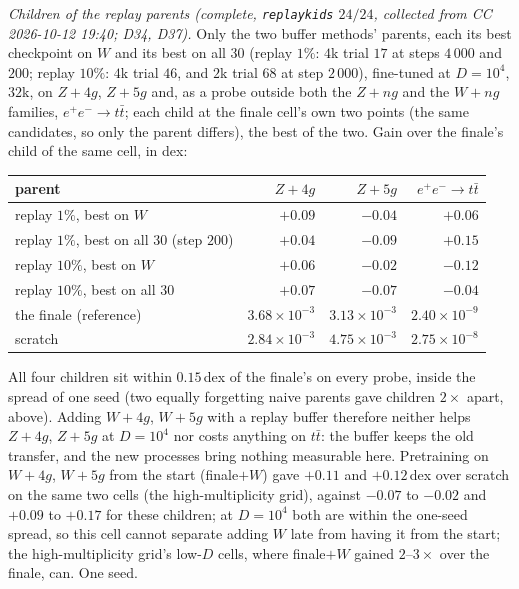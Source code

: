 \documentclass[11pt]{article}
\newcommand{\code}[1]{\texttt{#1}}
\begin{document}
\emph{Children of the replay parents (complete, \code{replaykids} $24/24$, collected from CC 2026-10-12 19:40; D34, D37).}
Only the two buffer methods' parents, each its best checkpoint on $W$ and its best on all $30$ (replay $1\%$: $4$k trial
$17$ at steps $4\,000$ and $200$; replay $10\%$: $4$k trial $46$, and $2$k trial $68$ at step $2\,000$), fine-tuned at
$D=10^4$, $32$k, on $Z+4g$, $Z+5g$ and, as a probe outside both the $Z+ng$ and the $W+ng$ families, $e^+e^-\to t\bar t$;
each child at the finale cell's own two points (the same candidates, so only the parent differs), the best of the two.
Gain over the finale's child of the same cell, in dex:
\begin{center}\small
\begin{tabular}{lrrr}
parent & $Z+4g$ & $Z+5g$ & $e^+e^-\to t\bar t$ \\ \hline
replay $1\%$, best on $W$ & $+0.09$ & $-0.04$ & $+0.06$ \\
replay $1\%$, best on all $30$ (step $200$) & $+0.04$ & $-0.09$ & $+0.15$ \\
replay $10\%$, best on $W$ & $+0.06$ & $-0.02$ & $-0.12$ \\
replay $10\%$, best on all $30$ & $+0.07$ & $-0.07$ & $-0.04$ \\ \hline
the finale (reference) & $3.68\times10^{-3}$ & $3.13\times10^{-3}$ & $2.40\times10^{-9}$ \\
scratch & $2.84\times10^{-3}$ & $4.75\times10^{-3}$ & $2.75\times10^{-8}$ \\
\end{tabular}
\end{center}
All four children sit within $0.15$\,dex of the finale's on every probe, inside the spread of one seed (two equally
forgetting naive parents gave children $2\times$ apart, above). Adding $W+4g$, $W+5g$ with a replay buffer therefore
neither helps $Z+4g$, $Z+5g$ at $D=10^4$ nor costs anything on $t\bar t$: the buffer keeps the old transfer, and the new
processes bring nothing measurable here. Pretraining on $W+4g$, $W+5g$ from the start (finale$+W$) gave $+0.11$ and
$+0.12$\,dex over scratch on the same two cells (the high-multiplicity grid), against $-0.07$ to $-0.02$ and $+0.09$ to
$+0.17$ for these children; at $D=10^4$ both are within the one-seed spread, so this cell cannot separate adding $W$ late
from having it from the start; the high-multiplicity grid's low-$D$ cells, where finale$+W$ gained $2$--$3\times$ over
the finale, can. One seed.
\end{document}

